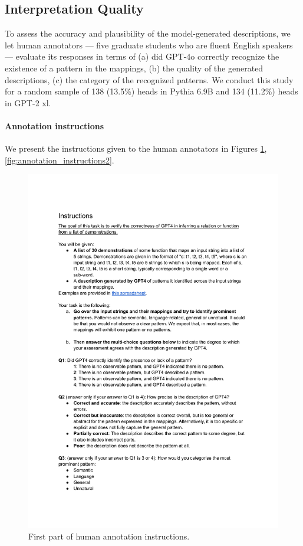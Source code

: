 \documentclass[11pt]{article}
\newcommand{\PythiaSevenB}{Pythia 6.9B}
\newcommand{\GPTxl}{GPT-2 xl}
\newcommand{\GPTFourO}{GPT-4o}
\begin{document}
\subsection{Interpretation Quality}
To assess the accuracy and plausibility of the model-generated descriptions, we let human annotators --- five graduate students who are fluent English speakers --- evaluate its responses in terms of (a) did \GPTFourO{} correctly recognize the existence of a pattern in the mappings, (b) the quality of the generated descriptions, (c) the category of the recognized patterns. We conduct this study for a random sample of 138 (13.5\%) heads in \PythiaSevenB{} and 134 (11.2\%) heads in \GPTxl{}. 

\paragraph{Annotation instructions}
We present the instructions given to the human annotators in Figures \ref{fig:annotation_instructions1},\ref{fig:annotation_instructions2}.

\begin{figure}[htbp]
    \centering
    \includegraphics[scale=0.75]
    {figures/annotation_instructions1}
    \caption{First part of human annotation instructions.}
    \label{fig:annotation_instructions1}
\end{figure}
\end{document}
